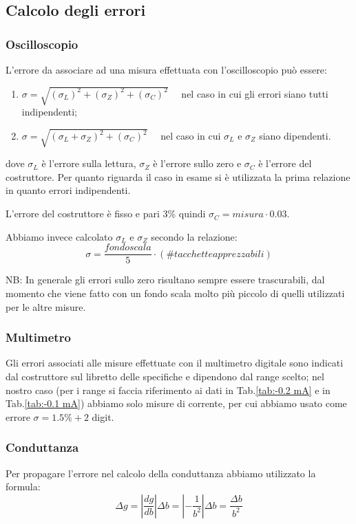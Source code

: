 \documentclass[a4paper, 11pt]{article}
\begin{document}
\subsection{Calcolo degli errori} \label{sec:errori}
\subsubsection{Oscilloscopio}
L'errore da associare ad una misura effettuata con l'oscilloscopio può essere:
\begin{enumerate}
    \item $\sigma = \sqrt{(\sigma_L)^2 + (\sigma_Z)^2 + (\sigma_C)^2} \quad$ nel caso in cui gli errori siano tutti indipendenti;
    \item  $\sigma = \sqrt{(\sigma_L + \sigma_Z)^2 + (\sigma_C)^2} \quad$ nel caso in cui $\sigma_L$ e $\sigma_Z$ siano dipendenti.
    \end{enumerate}
dove $\sigma_L$ è l'errore sulla lettura, $\sigma_Z$ è l'errore sullo zero e $\sigma_C$ è l'errore del costruttore. Per quanto riguarda il caso in esame si è utilizzata la prima relazione in quanto errori indipendenti.

L'errore del costruttore è fisso e pari 3\% quindi $\sigma_C = misura \cdot 0.03$.

Abbiamo invece calcolato $\sigma_L$ e $\sigma_Z$ secondo la relazione: 
\begin{equation*}
    \sigma = \frac{fondo scala}{5} \cdot ( \# tacchette apprezzabili)
\end{equation*}

NB: In generale gli errori sullo zero risultano sempre essere trascurabili, dal momento che viene fatto con un fondo scala molto più piccolo di quelli utilizzati per le altre misure.

\subsubsection{Multimetro}
Gli errori associati alle misure effettuate con il multimetro digitale sono indicati dal costruttore sul libretto delle specifiche e dipendono dal range scelto; nel nostro caso (per i range si faccia riferimento ai dati in Tab.\ref{tab:-0.2 mA} e in Tab.\ref{tab:-0.1 mA}) abbiamo solo misure di corrente, per cui abbiamo usato come errore $\sigma = 1.5\% + 2$ digit.

\subsubsection{Conduttanza} \label{sec:errori-conduttanza}
Per propagare l'errore nel calcolo della conduttanza abbiamo utilizzato la formula:
\begin{equation*}
    \Delta g = \left|\frac{dg}{db}\right| \Delta b = \left |-\frac{1}{b^2}\right| \Delta b = \frac{\Delta b}{b^2}
\end{equation*}
\end{document}
